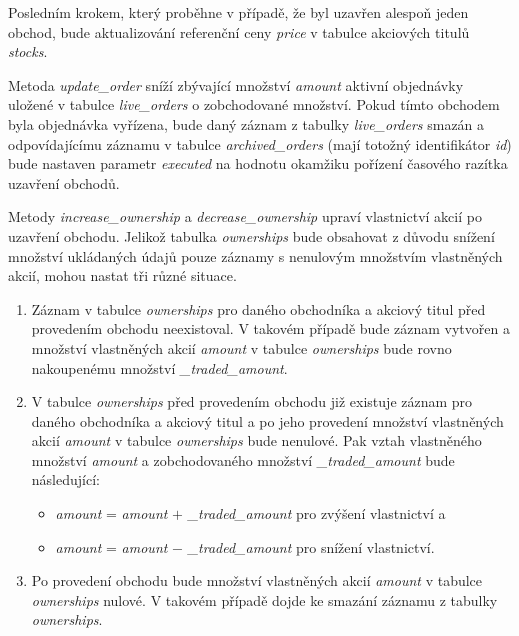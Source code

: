 \documentclass[thesis=M,czech]{FITthesis}[2012/06/26]
\begin{document}
Posledním krokem, který proběhne v případě, že byl uzavřen alespoň jeden obchod, bude aktualizování referenční ceny \textit{price} v tabulce
akciových titulů \textit{stocks}.

Metoda \textit{update\_order} sníží zbývající množství \textit{amount} aktivní objednávky uložené v tabulce \textit{live\_orders} o zobchodované 
množství. Pokud tímto obchodem byla objednávka vyřízena, bude daný záznam z tabulky \textit{live\_orders} smazán a odpovídajícímu záznamu 
v tabulce \textit{archived\_orders} (mají totožný identifikátor \textit{id}) bude nastaven parametr \textit{executed} na hodnotu okamžiku pořízení 
časového razítka uzavření obchodů.

Metody \textit{increase\_ownership} a \textit{decrease\_ownership} upraví vlastnictví akcií po uzavření obchodu. Jelikož tabulka \textit{ownerships} 
bude obsahovat z důvodu snížení množství ukládaných údajů pouze záznamy s nenulovým množstvím vlastněných akcií, mohou nastat tři různé 
situace.

\begin{enumerate}
	\item Záznam v tabulce \textit{ownerships} pro daného obchodníka a akciový titul před provedením obchodu neexistoval. V takovém případě 
		bude záznam vytvořen a množství vlastněných akcií \textit{amount} v tabulce \textit{ownerships} bude rovno nakoupenému množství
		\textit{\_traded\_amount}.
	\item V tabulce \textit{ownerships} před provedením obchodu již existuje záznam pro daného obchodníka a akciový titul a po jeho provedení
		množství vlastněných akcií \textit{amount} v tabulce \textit{ownerships} bude nenulové. Pak vztah vlastněného množství \textit{amount} 
		a zobchodovaného množství \textit{\_traded\_amount} bude následující: 
		\begin{itemize}
			\item \textit{amount} = \textit{amount} \(+\) \textit{\_traded\_amount} pro zvýšení vlastnictví a
			\item \textit{amount} = \textit{amount} \(-\) \textit{\_traded\_amount} pro snížení vlastnictví.
		\end{itemize}
	\item Po provedení obchodu bude množství vlastněných akcií \textit{amount} v tabulce \textit{ownerships} nulové. V takovém případě dojde
		ke smazání záznamu z tabulky \textit{ownerships}.
\end{enumerate}


\end{document}
